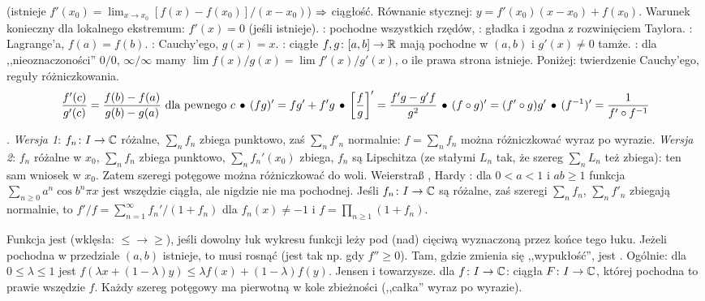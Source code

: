   (istnieje $f'(x_0) = \lim_{x\rightarrow x_0} [f(x)-f(x_0)]/(x-x_0)$) $\Rightarrow$ ciągłość.
Równanie  stycznej: $y=f'(x_0)(x-x_0)+f(x_0)$.  
Warunek konieczny dla lokalnego ekstremum: $f'(x) = 0$ (jeśli istnieje).
: pochodne wszystkich rzędów, : gładka i zgodna z rozwinięciem Taylora.
:  Lagrange'a, $f(a) = f(b)$.
: Cauchy'ego, $g(x) = x$.
: ciągłe $f, g \colon [a,b] \to \mathbb{R}$ mają pochodne w $(a,b)$ i $g'(x) \neq 0$ tamże.
: dla ,,nieoznaczoności'' $0/0$, $\infty/\infty$ mamy $\lim f(x)/g(x) = \lim f'(x) / g'(x)$, o ile prawa strona istnieje.
Poniżej: twierdzenie Cauchy'ego, reguły różniczkowania.
\[
	\dfrac{f'(c)}{g'(c)} = \frac{f(b) - f(a)}{g(b)-g(a)} \mbox{ dla pewnego } c \, \bullet \,
	(fg)' = fg' + f'g \, \bullet \,
	\left[\frac f g \right]' = \frac{f'g - g'f}{g^2} \, \bullet \,
	(f \circ g)' = (f' \circ g) g' \, \bullet \,
	(f^{-1})' = \frac 1 {f' \circ {f^{-1}}}
\]

.
\emph{Wersja 1}:  $f_n \colon I \to \mathbb{C}$ różalne, $\sum_n f_n$ zbiega punktowo, zaś $\sum_n f'_n$ normalnie: $f = \sum_ n f_n$ można różniczkować wyraz po wyrazie.
\emph{Wersja 2}: $f_n$ różalne w $x_0$, $\sum_n f_n$ zbiega punktowo, $\sum_n f_n'(x_0)$ zbiega, $f_n$ są Lipschitza (ze stałymi $L_n$ tak, że szereg $\sum_n L_n$ też zbiega): ten sam wniosek w $x_0$.
Zatem szeregi potęgowe można różniczkować do woli.
Weierstraß , Hardy : dla $0 < a < 1$ i $ab \ge 1$ funkcja $\sum_{n \ge 0} a^n \cos b^n \pi x$ jest wszędzie ciągła, ale nigdzie nie ma pochodnej.
Jeśli $f_n \colon I \to \mathbb{C}$ są różalne, zaś szeregi $\sum_n f_n$, $\sum_n f'_n$ zbiegają normalnie, to $f'/f = \sum_{n=1}^\infty f_n' / (1 + f_n)$ dla $f_n(x) \neq -1$ i $f = \prod_{n \ge 1} (1 + f_n)$.

Funkcja  jest  (wklęsła: $\le \to \ge$), jeśli dowolny łuk wykresu funkcji leży pod (nad) cięciwą wyznaczoną przez końce tego łuku.
Jeżeli pochodna w przedziale $(a,b)$ istnieje, to musi rosnąć (jest tak np. gdy $f'' \ge 0$).
Tam, gdzie zmienia się ,,wypukłość'', jest .
Ogólnie: dla $0 \le \lambda \le 1$ jest $f(\lambda x+(1-\lambda)y) \le \lambda f(x) + (1-\lambda)f(y)$.
Jensen i towarzysze.
  dla $f \colon I \to \mathbb{C}$: ciągła $F \colon I \to \mathbb{C}$, której pochodna to prawie wszędzie $f$.
Każdy szereg potęgowy ma pierwotną w kole zbieżności (,,całka'' wyraz po wyrazie).